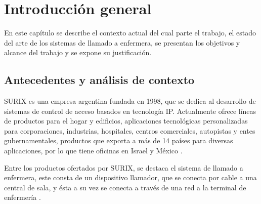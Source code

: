 
\chapter{Introducción general} %

\label{Chapter1} %

En este capítulo se describe el contexto actual del cual parte el trabajo, el estado del arte de los sistemas de llamado a enfermera, se presentan los objetivos y alcance del trabajo y se expone su justificación.

\label{IntroGeneral}


\newcommand{\keyword}[1]{\textbf{#1}}
\newcommand{\tabhead}[1]{\textbf{#1}}
\newcommand{\code}[1]{\texttt{#1}}
\newcommand{\file}[1]{\texttt{\bfseries#1}}
\newcommand{\option}[1]{\texttt{\itshape#1}}
\newcommand{\grados}{$^{\circ}$}



\section{Antecedentes y análisis de contexto}

SURIX es una empresa argentina fundada en 1998, que se dedica al desarrollo de sistemas de control de acceso basados en tecnología IP. Actualmente ofrece líneas de productos para el hogar y edificios, aplicaciones tecnológicas personalizadas para corporaciones, industrias, hospitales, centros comerciales, autopistas y entes gubernamentales, productos que exporta a más de 14 países para diversas aplicaciones, por lo que tiene oficinas en Israel y México \cite{1}.

Entre los productos ofertados por SURIX, se destaca el sistema de llamado a enfermera, este consta de un dispositivo llamador, que se conecta por cable a una central de sala, y ésta a su vez se conecta a través de una red a la terminal de enfermería \cite{2}.

